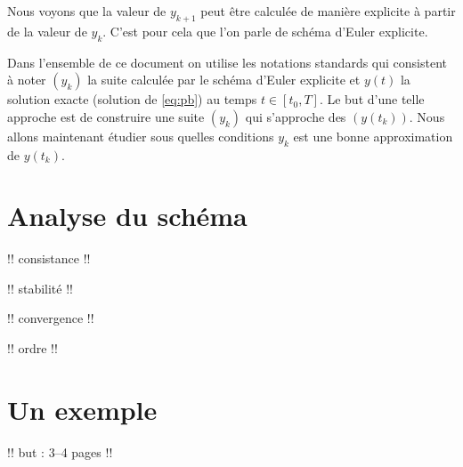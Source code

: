 \documentclass[12pt,a4paper,twoside]{article}
\begin{document}
Nous voyons que la valeur de $y_{k+1}$ peut \^etre calcul\'ee de mani\`ere explicite 
\`a partir de la valeur de $y_k$. C'est pour cela que l'on parle de sch\'ema
d'Euler explicite.


Dans l'ensemble de ce document on utilise les notations standards qui consistent
\`a noter $(y_k)$ la suite calcul\'ee par le sch\'ema d'Euler explicite
et $y(t)$ la solution exacte (solution de \eqref{eq:pb}) au temps $t \in [t_0,T]$.
Le but d'une telle approche est de construire une suite $(y_k)$ qui s'approche
des $(y(t_k))$. Nous allons maintenant \'etudier sous quelles conditions
$y_k$ est une bonne approximation de $y(t_k)$.
\section{Analyse du sch\'ema}

!! consistance !!

!! stabilit\'e !!

!! convergence !!

!! ordre !!


\section{Un exemple}

!! but : 3--4 pages !!

\end{document}

